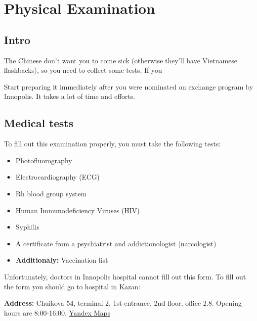 
\chapter{Physical Examination}\label{ch:ru_medical_examination}

\section{Intro}\label{sec:ru_}


The Chinese don't want you to come sick
(otherwise they'll have Vietnamese flashbacks),
so you need to collect some tests.
If you


\begin{note}
    Start preparing it immediately after
    you were nominated on exchange program by Innopolis.
    It takes a lot of time and efforts.
\end{note}



\section{Medical tests}\label{sec:ru_medical_tests}

To fill out this examination properly,
you must take the following tests:
\begin{itemize}
    \item Photofluorography
    \item Electrocardiography (ECG)
    \item Rh blood group system
    \item Human Immunodeficiency Viruses (HIV)
    \item Syphilis
    \item A certificate from a psychiatrist and addictionologist (narcologist)
    \item \textbf{Additionaly:} Vaccination list
\end{itemize}


Unfortunately, doctors in Innopolis hospital cannot fill out this form.
To fill out the form you should go to hospital in Kazan:

\textbf{Address:} Chuikova 54, terminal 2, 1st entrance,
2nd floor, office 2.8. Opening hours are 8:00-16:00.
\href{https://yandex.ru/maps/-/CHeHe8KC}{Yandex Maps}











